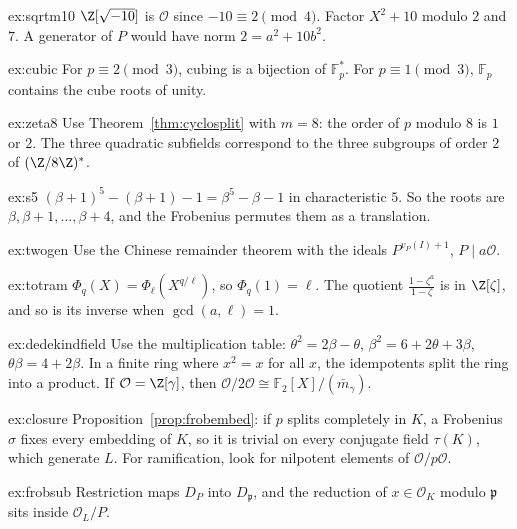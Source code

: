 \begin{hint}{ex:sqrtm10}
$\Z[\sqrt{-10}]$ is $\mathcal O$ since $-10\equiv2\pmod4$. Factor $X^2+10$ modulo $2$ and $7$. A generator of $P$ would
have norm $2=a^2+10b^2$.
\end{hint}
\begin{hint}{ex:cubic}
For $p\equiv2\pmod3$, cubing is a bijection of $\mathbb F_p^*$. For $p\equiv1\pmod3$, $\mathbb F_p$ contains the cube roots
of unity.
\end{hint}
\begin{hint}{ex:zeta8}
Use Theorem~\ref{thm:cyclosplit} with $m=8$: the order of $p$ modulo $8$ is $1$ or $2$. The three quadratic subfields
correspond to the three subgroups of order $2$ of $(\Z/8\Z)^*$.
\end{hint}
\begin{hint}{ex:s5}
$(\beta+1)^5-(\beta+1)-1=\beta^5-\beta-1$ in characteristic $5$. So the roots are $\beta,\beta+1,\dots,\beta+4$, and
the Frobenius permutes them as a translation.
\end{hint}
\begin{hint}{ex:twogen}
Use the Chinese remainder theorem with the ideals $P^{v_P(I)+1}$, $P\mid a\mathcal O$.
\end{hint}
\begin{hint}{ex:totram}
$\Phi_q(X)=\Phi_\ell(X^{q/\ell})$, so $\Phi_q(1)=\ell$. The quotient $\frac{1-\zeta^a}{1-\zeta}$ is in $\Z[\zeta]$, and so is
its inverse when $\gcd(a,\ell)=1$.
\end{hint}
\begin{hint}{ex:dedekindfield}
Use the multiplication table: $\theta^2=2\beta-\theta$, $\beta^2=6+2\theta+3\beta$, $\theta\beta=4+2\beta$. In a
finite ring where $x^2=x$ for all $x$, the idempotents split the ring into a product. If $\mathcal O=\Z[\gamma]$, then
$\mathcal O/2\mathcal O\cong\mathbb F_2[X]/(\bar m_\gamma)$.
\end{hint}
\begin{hint}{ex:closure}
Proposition~\ref{prop:frobembed}: if $p$ splits completely in $K$, a Frobenius $\sigma$ fixes every embedding of $K$, so
it is trivial on every conjugate field $\tau(K)$, which generate $L$. For ramification, look for nilpotent elements of
$\mathcal O/p\mathcal O$.
\end{hint}
\begin{hint}{ex:frobsub}
Restriction maps $D_P$ into $D_{\mathfrak p}$, and the reduction of $x\in\mathcal O_K$ modulo $\mathfrak p$ sits inside
$\mathcal O_L/P$.
\end{hint}
